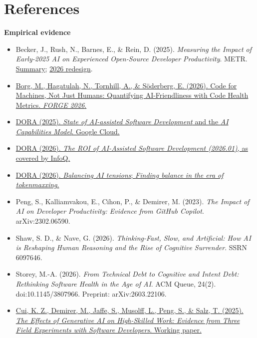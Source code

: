 \documentclass[11pt]{article}
\begin{document}
\section*{References}

\textbf{Empirical evidence}
\begin{itemize}[leftmargin=*]
  \item Becker, J., Rush, N., Barnes, E., \& Rein, D. (2025). \emph{Measuring the Impact of Early-2025 AI on Experienced Open-Source Developer Productivity}. METR. \href{https://scienceblog.com/?p=582102}{Summary}; \href{https://blog.robbowley.net/?p=3038}{2026 redesign}.
  \item \href{https://arxiv.org/abs/2601.02200v1}{Borg, M., Hagatulah, N., Tornhill, A., \& S\"oderberg, E. (2026). Code for Machines, Not Just Humans: Quantifying AI-Friendliness with Code Health Metrics. \emph{FORGE 2026}.}
  \item \href{https://cloud.google.com/blog/products/ai-machine-learning/from-adoption-to-impact-putting-the-dora-ai-capabilities-model-to-work}{DORA (2025). \emph{State of AI-assisted Software Development} and the \emph{AI Capabilities Model}. Google Cloud.}
  \item \href{https://www.infoq.com/news/2026/05/dora-roi-ai-assisted-dev-report/}{DORA (2026). \emph{The ROI of AI-Assisted Software Development (2026.01)}, as covered by InfoQ.}
  \item \href{https://dora.dev/insights/}{DORA (2026). \emph{Balancing AI tensions}; \emph{Finding balance in the era of tokenmaxxing}.}
  \item Peng, S., Kalliamvakou, E., Cihon, P., \& Demirer, M. (2023). \emph{The Impact of AI on Developer Productivity: Evidence from GitHub Copilot}. arXiv:2302.06590.
  \item Shaw, S. D., \& Nave, G. (2026). \emph{Thinking-Fast, Slow, and Artificial: How AI is Reshaping Human Reasoning and the Rise of Cognitive Surrender}. SSRN 6097646.
  \item Storey, M.-A. (2026). \emph{From Technical Debt to Cognitive and Intent Debt: Rethinking Software Health in the Age of AI}. ACM Queue, 24(2). doi:10.1145/3807966. Preprint: arXiv:2603.22106.
  \item \href{https://economics.mit.edu/sites/default/files/inline-files/draft_copilot_experiments.pdf}{Cui, K. Z., Demirer, M., Jaffe, S., Musolff, L., Peng, S., \& Salz, T. (2025). \emph{The Effects of Generative AI on High-Skilled Work: Evidence from Three Field Experiments with Software Developers}. Working paper.}

\end{itemize}
\end{document}
